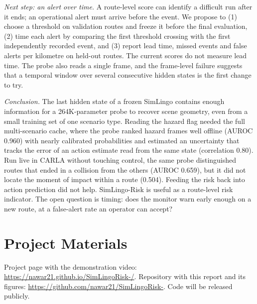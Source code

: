 \documentclass[conference]{IEEEtran}
\begin{document}
\emph{Next step: an alert over time.} A route-level score can identify a difficult
run after it ends; an operational alert must arrive before the event. We propose to
(1) choose a threshold on validation routes and freeze it before the final
evaluation, (2) time each alert by comparing the first threshold crossing with the
first independently recorded event, and (3) report lead time, missed events and
false alerts per kilometre on held-out routes. The current scores do not measure
lead time. The probe also reads a single frame, and the frame-level failure suggests
that a temporal window over several consecutive hidden states is the first change to
try.

\emph{Conclusion.} The last hidden state of a frozen SimLingo contains enough
information for a 264K-parameter probe to recover scene geometry, even from a small
training set of one scenario type. Reading the hazard flag needed the full
multi-scenario cache, where the probe ranked hazard frames well offline (AUROC
0.960) with nearly calibrated probabilities and estimated an uncertainty that
tracks the error of an action estimate read from the same state (correlation 0.80).
Run live in CARLA without touching control, the same probe distinguished routes that
ended in a collision from the others (AUROC 0.659), but it did not locate the moment
of impact within a route (0.504). Feeding the risk back into action prediction did
not help. SimLingo-Risk is useful as a route-level risk indicator. The open question
is timing: does the monitor warn early enough on a new route, at a false-alert rate
an operator can accept?

\section*{Project Materials}

Project page with the demonstration video:
\url{https://nawar21.github.io/SimLingoRisk-/}.
Repository with this report and its figures:
\url{https://github.com/nawar21/SimLingoRisk-}.
Code will be released publicly.
\end{document}
